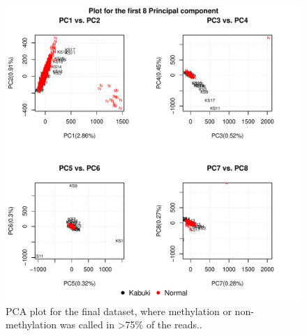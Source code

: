 \begin{figure}[!h]
    \centering
    \includegraphics[width=\textwidth]{figures/PCA/certain/pca_plot_label_larger.pdf}
    \caption{PCA plot for the final dataset, where methylation or non-methylation was called in >75\% of the reads..}
    \label{fig:certain-PCA}
\end{figure}
\fi 

